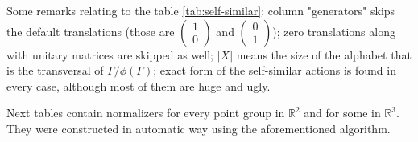 \documentclass[a4paper,12pt]{amsart}
\theoremstyle{definition}
\begin{document}
	Some remarks relating to the table \ref{tab:self-similar}: column "generators" skips the default translations (those are $\begin{pmatrix}1 \\ 0\end{pmatrix}$ and $\begin{pmatrix}0 \\ 1\end{pmatrix}$); zero translations along with unitary matrices are skipped as well; $|X|$ means the size of the alphabet that is the transversal of $\Gamma / \phi(\Gamma)$; exact form of the self-similar actions is found in every case, although most of them are huge and ugly.  
	
	Next tables contain normalizers for every point group in $\mathbb{R}^2$ and for some in $\mathbb{R}^3$. They were constructed in automatic way using the aforementioned algorithm. 
	
\end{document}
